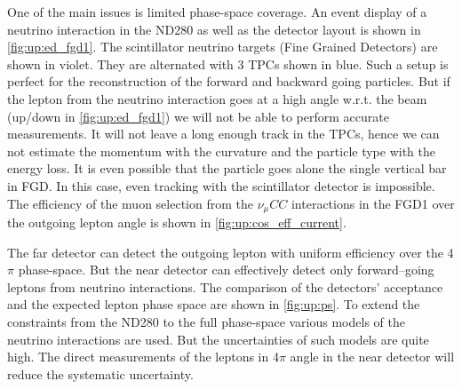 \documentclass[main.tex]{subfiles}
\begin{document}
One of the main issues is limited phase-space coverage. An event display of a neutrino interaction in the ND280 as well as the detector layout is shown in \autoref{fig:up:ed_fgd1}. The scintillator neutrino targets (Fine Grained Detectors) are shown in violet. They are alternated with 3 TPCs shown in blue. Such a setup is perfect for the reconstruction of the forward and backward going particles. But if the lepton from the neutrino interaction goes at a high angle w.r.t. the beam (up/down in \autoref{fig:up:ed_fgd1}) we will not be able to perform accurate measurements. It will not leave a long enough track in the TPCs, hence we can not estimate the momentum with the curvature and the particle type with the energy loss. It is even possible that the particle goes alone the single vertical bar in FGD. In this case, even tracking with the scintillator detector is impossible. The efficiency of the muon selection from the $\nu_\mu CC$ interactions in the FGD1 over the outgoing lepton angle is shown in \autoref{fig:up:cos_eff_current}.

The far detector can detect the outgoing lepton with uniform efficiency over the 4$\pi$ phase-space. But the near detector can effectively detect only forward--going leptons from neutrino interactions. The comparison of the detectors' acceptance and the expected lepton phase space are shown in \autoref{fig:up:ps}. To extend the constraints from the ND280 to the full phase-space various models of the neutrino interactions are used. But the uncertainties of such models are quite high. The direct measurements of the leptons in 4$\pi$ angle in the near detector will reduce the systematic uncertainty.
\end{document}
